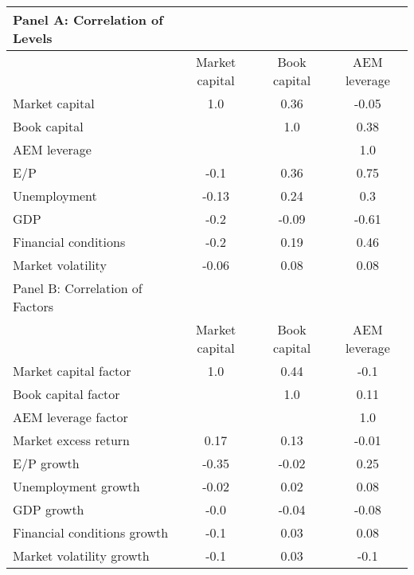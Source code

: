 
    \begin{table}[htbp]
    \centering
    \begin{adjustbox}{max width=\textwidth}
    \small
    \begin{tabular}{lccc}
        \toprule
        Panel A: Correlation of Levels \\
        \midrule
         & Market capital & Book capital & AEM leverage \\
        \midrule
        Market capital & 1.0 & 0.36 & -0.05 \\
Book capital &  & 1.0 & 0.38 \\
AEM leverage &  &  & 1.0 \\
E/P & -0.1 & 0.36 & 0.75 \\
Unemployment & -0.13 & 0.24 & 0.3 \\
GDP & -0.2 & -0.09 & -0.61 \\
Financial conditions & -0.2 & 0.19 & 0.46 \\
Market volatility & -0.06 & 0.08 & 0.08 \\
        \midrule
        Panel B: Correlation of Factors \\
        \midrule
         & Market capital & Book capital & AEM leverage \\
        \midrule
        Market capital factor & 1.0 & 0.44 & -0.1 \\
Book capital factor &  & 1.0 & 0.11 \\
AEM leverage factor &  &  & 1.0 \\
Market excess return & 0.17 & 0.13 & -0.01 \\
E/P growth & -0.35 & -0.02 & 0.25 \\
Unemployment growth & -0.02 & 0.02 & 0.08 \\
GDP growth & -0.0 & -0.04 & -0.08 \\
Financial conditions growth & -0.1 & 0.03 & 0.08 \\
Market volatility growth & -0.1 & 0.03 & -0.1 \\
        \bottomrule
    \end{tabular}
    \end{adjustbox}
    \end{table}
    